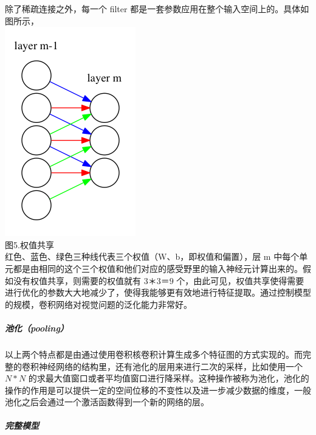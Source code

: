 除了稀疏连接之外，每一个 filter
都是一套参数应用在整个输入空间上的。具体如图所示，\\\includegraphics{picture/shared-weights.png}\\图5.权值共享\\红色、蓝色、绿色三种线代表三个权值（W、b，即权值和偏置），层
m
中每个单元都是由相同的这个三个权值和他们对应的感受野里的输入神经元计算出来的。假如没有权值共享，则需要的权值就有
\(3 ＊ 3 ＝ 9\)
个，由此可见，权值共享使得需要进行优化的参数大大地减少了，使得我能够更有效地进行特征提取。通过控制模型的规模，卷积网络对视觉问题的泛化能力非常好。

\subparagraph{池化（pooling）}\label{ux6c60ux5316pooling}

以上两个特点都是由通过使用卷积核卷积计算生成多个特征图的方式实现的。而完整的卷积神经网络的结构里，还有池化的层用来进行二次的采样，比如使用一个
\(N*N\)
的求最大值窗口或者平均值窗口进行降采样。这种操作被称为池化，池化的操作的作用是可以提供一定的空间位移的不变性以及进一步减少数据的维度，一般池化之后会通过一个激活函数得到一个新的网络的层。

\subparagraph{完整模型}\label{ux5b8cux6574ux6a21ux578b}

